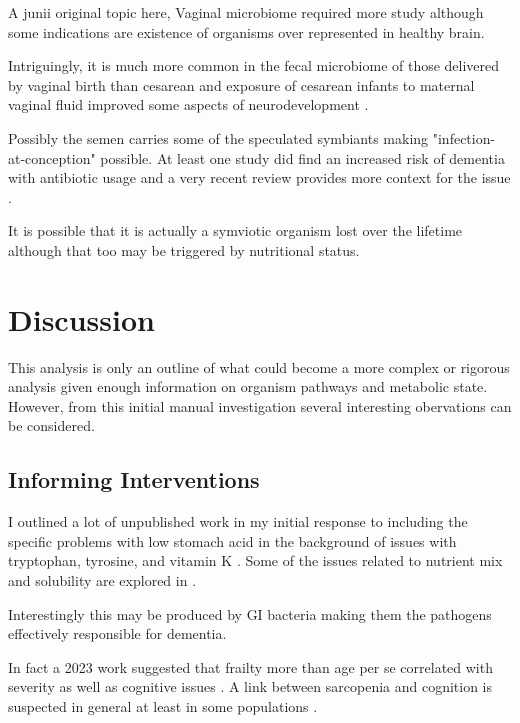 \documentclass[aps,secnumarabic,balancelastpage,amsmath,amssymb,nofootinbib]{revtex4}
\begin{document}
A junii original topic here, 
Vaginal microbiome required more study although some
indications are existence of organisms over represented
in healthy brain. 

Intriguingly, it is much more common in the fecal microbiome of
those delivered by vaginal
birth than cesarean \cite{Pandey2012}
and exposure of cesarean infants to maternal vaginal fluid
improved some aspects of neurodevelopment 
\cite{Zhou_Qiu_Wang_Effects_vaginal_microbiota_2023}.



Possibly the semen carries some of the speculated symbiants
\cite{Koort_Sosa_Turk_Lactobacillus_crispatus_2023}
\cite{10.3389/fcimb.2022.815786}
making "infection-at-conception" possible. 
At least one study did find an increased risk of dementia with
antibiotic usage
\cite{10.3389/fphar.2022.888333}
and a very recent review provides more context for the issue
\cite{KarenMOttemann_2023}.

It is possible that it is actually a symviotic organism lost
over the lifetime although that too may be triggered by nutritional
status. 

\section{Discussion  }

This analysis is only an outline of what could become
a more complex or rigorous analysis given enough
information on organism pathways and metabolic state.
However, from this initial manual investigation 
several interesting obervations can be considered.
\subsection{Informing Interventions   }


I outlined a lot of unpublished work in my initial
response to \mjmdisease including the
specific problems with low stomach acid
in the background of issues with tryptophan, tyrosine, and
vitamin K 
\cite{mmarchywka-MJM-2020-002-0.10}.
Some of the issues related to nutrient mix and solubility
are explored in 
\cite{marchywka-MJM-2022-009-0.50rg}
\cite{marchywka-MJM-2022-013-0.10}
\cite{marchywka-MJM-2021-014-0.80-rg}
\cite{marchywka-MJM-2021-018-0.50rg}
.

Interestingly this may be produced by GI bacteria 
making them the pathogens effectively
responsible for dementia. 


In fact a 2023 work suggested that frailty more
than age per se correlated with \mjmdisease severity
as well as cognitive issues
\cite{Matsumoto_Shibata_Kishi_Long_COVID_hypertension_2023}.
A link between sarcopenia and cognition is suspected
in general at least in some populations
\cite{PMC9965467}.
\end{document}
